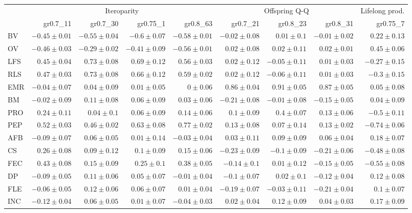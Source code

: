 \begin{landscape}
\begin{table}
\begin{footnotesize}
\begin{tabular}{@{}l|rrrr|rrr|r@{}}
\toprule
 & \multicolumn{4}{c|}{Iteroparity} & \multicolumn{3}{c|}{Offspring Q-Q} & \multicolumn{1}{c}{Lifelong prod.}\\
 & gr0.7\_11 & gr0.7\_30 & gr0.75\_1 & gr0.8\_63 & gr0.7\_21 & gr0.8\_23 & gr0.8\_31 & gr0.75\_7\\
\midrule
BV & $-0.45 \pm 0.01$ & $-0.55 \pm 0.04$ & $-0.6 \pm 0.07$ & $-0.58 \pm 0.01$ & $-0.02 \pm 0.08$ & $0.01 \pm 0.1$ & $-0.01 \pm 0.02$ & $0.22 \pm 0.13$\\
OV & $-0.46 \pm 0.03$ & $-0.29 \pm 0.02$ & $-0.41 \pm 0.09$ & $-0.56 \pm 0.01$ & $0.02 \pm 0.08$ & $0.02 \pm 0.11$ & $0.02 \pm 0.01$ & $0.45 \pm 0.06$\\
LFS & $0.45 \pm 0.04$ & $0.73 \pm 0.08$ & $0.69 \pm 0.12$ & $0.56 \pm 0.03$ & $0.02 \pm 0.12$ & $-0.05 \pm 0.11$ & $0.01 \pm 0.03$ & $-0.27 \pm 0.15$\\
RLS & $0.47 \pm 0.03$ & $0.73 \pm 0.08$ & $0.66 \pm 0.12$ & $0.59 \pm 0.02$ & $0.02 \pm 0.12$ & $-0.06 \pm 0.11$ & $0.01 \pm 0.03$ & $-0.3 \pm 0.15$\\
EMR & $-0.04 \pm 0.07$ & $0.04 \pm 0.09$ & $0.01 \pm 0.05$ & $0 \pm 0.06$ & $0.86 \pm 0.04$ & $0.91 \pm 0.05$ & $0.87 \pm 0.05$ & $0.05 \pm 0.08$\\
BM & $-0.02 \pm 0.09$ & $0.11 \pm 0.08$ & $0.06 \pm 0.09$ & $0.03 \pm 0.06$ & $-0.21 \pm 0.08$ & $-0.01 \pm 0.08$ & $-0.15 \pm 0.05$ & $0.04 \pm 0.09$\\
PRO & $0.24 \pm 0.11$ & $0.04 \pm 0.1$ & $0.06 \pm 0.09$ & $0.14 \pm 0.06$ & $0.1 \pm 0.09$ & $0.4 \pm 0.07$ & $0.13 \pm 0.06$ & $-0.5 \pm 0.11$\\
PEP & $0.52 \pm 0.03$ & $0.46 \pm 0.02$ & $0.63 \pm 0.08$ & $0.77 \pm 0.02$ & $0.13 \pm 0.08$ & $0.07 \pm 0.14$ & $0.13 \pm 0.02$ & $-0.74 \pm 0.06$\\
AFB & $-0.09 \pm 0.07$ & $0.06 \pm 0.05$ & $0.01 \pm 0.14$ & $-0.03 \pm 0.04$ & $0.03 \pm 0.11$ & $0.09 \pm 0.09$ & $0.06 \pm 0.04$ & $0.18 \pm 0.07$\\
CS & $0.26 \pm 0.08$ & $0.09 \pm 0.12$ & $0.1 \pm 0.09$ & $0.15 \pm 0.06$ & $-0.23 \pm 0.09$ & $-0.1 \pm 0.09$ & $-0.21 \pm 0.06$ & $-0.48 \pm 0.08$\\
FEC & $0.43 \pm 0.08$ & $0.15 \pm 0.09$ & $0.25 \pm 0.1$ & $0.38 \pm 0.05$ & $-0.14 \pm 0.1$ & $0.01 \pm 0.12$ & $-0.15 \pm 0.05$ & $-0.55 \pm 0.08$\\
DP & $-0.09 \pm 0.05$ & $0.11 \pm 0.06$ & $0.05 \pm 0.07$ & $-0.01 \pm 0.04$ & $-0.1 \pm 0.07$ & $0.02 \pm 0.1$ & $-0.12 \pm 0.04$ & $0.12 \pm 0.08$\\
FLE & $-0.06 \pm 0.05$ & $0.12 \pm 0.06$ & $0.06 \pm 0.07$ & $0.01 \pm 0.04$ & $-0.19 \pm 0.07$ & $-0.03 \pm 0.11$ & $-0.21 \pm 0.04$ & $0.1 \pm 0.07$\\
INC & $-0.12 \pm 0.04$ & $0.06 \pm 0.05$ & $0.01 \pm 0.07$ & $-0.04 \pm 0.03$ & $0.02 \pm 0.04$ & $0.12 \pm 0.09$ & $0.04 \pm 0.03$ & $0.17 \pm 0.09$\\
\bottomrule
\end{tabular}


\end{footnotesize}
\end{table}
\end{landscape}
